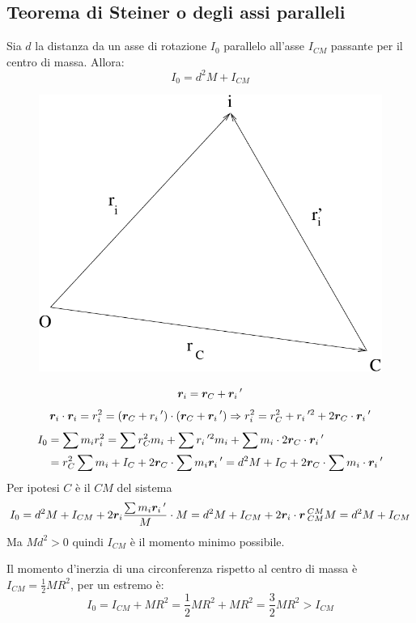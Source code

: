 \subsection{Teorema di Steiner o degli assi paralleli}
\begin{Teo}Sia $d$ la distanza da un asse di rotazione $I_0$ parallelo all'asse $I_{CM}$ passante per il centro di massa. Allora:
  \[I_0=d^2M+I_{CM}\]
\end{Teo}
\begin{figure}[htbp]
  \centering
  \includegraphics[scale=0.45]{immagini/fisica1/steiner}
\end{figure}
\[\boldsymbol{r}_i=\boldsymbol{r}_C+\boldsymbol{r}_i\,'\]
\[\boldsymbol{r}_i\cdot\boldsymbol{r}_i=r_i^2=\left(\boldsymbol{r}_C+r_i\,'\right)\cdot\left(\boldsymbol{r}_C+\boldsymbol{r}_i\,'\right)\Rightarrow
  r_i^2=r_C^2+r_i\,'^2+2\boldsymbol{r}_C\cdot\boldsymbol{r}_i\,'\]
\begin{align*}
  I_0 & =\sum m_ir_i^2=\sum r_C^2m_i+\sum r_i\,'^2m_i+\sum m_i
  \cdot 2\boldsymbol{r}_C\cdot \boldsymbol{r}_i\,'                               \\
      & =r_C^2\sum m_i+I_C+2\boldsymbol{r}_C\cdot\sum m_i\boldsymbol{r}_i\,'=d^2M+I_{C}+2\boldsymbol{r}_C\cdot\sum m_i\cdot
  \boldsymbol{r}_i\,'\end{align*}
Per ipotesi $C$ è il $CM$ del sistema
\[I_0=d^2 M+I_{CM}+2\boldsymbol{r}_i\frac{\sum m_i\boldsymbol{r}_i\,'}{M}\cdot
  M=d^2M+I_{CM}+2\boldsymbol{r}_i\cdot \boldsymbol{r}\,_{CM}^{CM} M=d^2M+I_{CM}\]
Ma $Md^2>0$ quindi $I_{CM}$ è il momento minimo possibile.
\begin{Es}
  Il momento d'inerzia di una circonferenza rispetto al centro di massa è \mbox{$I_{CM}=\frac{1}{2}MR^2$}, per un estremo è:
  \[I_0=I_{CM}+MR^2=\frac{1}{2}MR^2+MR^2=\frac{3}{2}MR^2>I_{CM}\]
\end{Es}
